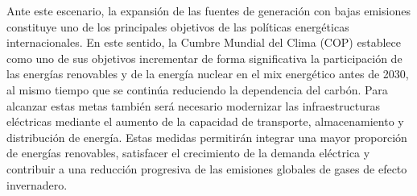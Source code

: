 Ante este escenario, la expansión de las fuentes de generación con bajas emisiones constituye uno de los principales objetivos de las políticas energéticas internacionales. En este sentido, la Cumbre Mundial del Clima (COP) \cite{cop2030} establece como uno de sus objetivos incrementar de forma significativa la participación de las energías renovables y de la energía nuclear en el mix energético antes de 2030, al mismo tiempo que se continúa reduciendo la dependencia del carbón. Para alcanzar estas metas también será necesario modernizar las infraestructuras eléctricas mediante el aumento de la capacidad de transporte, almacenamiento y distribución de energía. Estas medidas permitirán integrar una mayor proporción de energías renovables, satisfacer el crecimiento de la demanda eléctrica y contribuir a una reducción progresiva de las emisiones globales de gases de efecto invernadero.

